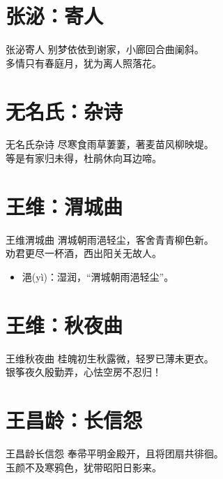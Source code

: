 \documentclass[12pt,oneside,a5paper]{book}
\begin{document}
\chapter{张泌：寄人}
\begin{poemzh}{张泌}{寄人}
别梦依依到谢家，小廊回合曲阑斜。\\
多情只有春庭月，犹为离人照落花。\\ 
\end{poemzh}

\chapter{无名氏：杂诗}
\begin{poemzh}{无名氏}{杂诗}
尽寒食雨草萋萋，著麦苗风柳映堤。\\
等是有家归未得，杜鹃休向耳边啼。\\ 
\end{poemzh}

\chapter{王维：渭城曲}
\begin{poemzh}{王维}{渭城曲}
渭城朝雨浥轻尘，客舍青青柳色新。\\
劝君更尽一杯酒，西出阳关无故人。\\ 
\end{poemzh}

\begin{itemize}
\item 浥(yì)：湿润，“渭城朝雨浥轻尘”。
\end{itemize}

\chapter{王维：秋夜曲}
\begin{poemzh}{王维}{秋夜曲}
桂魄初生秋露微，轻罗已薄未更衣。\\
银筝夜久殷勤弄，心怯空房不忍归！\\ 
\end{poemzh}

\chapter{王昌龄：长信怨}
\begin{poemzh}{王昌龄}{长信怨}
奉帚平明金殿开，且将团扇共徘徊。\\
玉颜不及寒鸦色，犹带昭阳日影来。\\ 
\end{poemzh}
\end{document}
